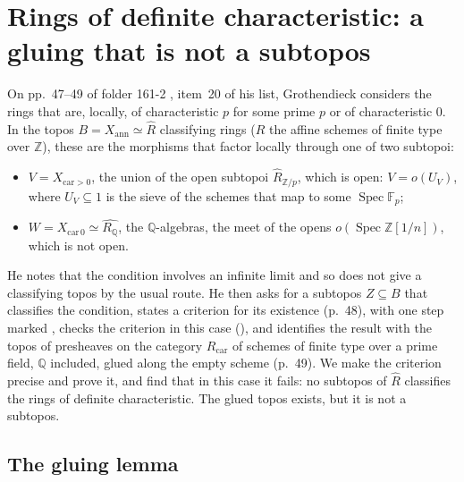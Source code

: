 \section{Rings of definite characteristic: a gluing that is not a subtopos}\label{sec:characteristic}

On pp.~47--49 of folder 161-2 \cite{grothendieck-161-2}, item~20 of his list, Grothendieck considers the rings that are, locally, of characteristic $p$ for some prime $p$ or of characteristic $0$. In the topos $B = X_{\mathrm{ann}} \simeq \widehat R$ classifying rings ($R$ the affine schemes of finite type over $\mathbb Z$), these are the morphisms that factor locally through one of two subtopoi:
\begin{itemize}
\item $V = X_{\mathrm{car}>0}$, the union of the open subtopoi $\widehat R_{\mathbb Z/p}$, which is open: $V = o(U_V)$, where $U_V \subseteq 1$ is the sieve of the schemes that map to some $\operatorname{Spec}\mathbb F_p$;
\item $W = X_{\mathrm{car}\,0} \simeq \widehat{R_{\mathbb Q}}$, the $\mathbb Q$-algebras, the meet of the opens $o(\operatorname{Spec}\mathbb Z[1/n])$, which is not open.
\end{itemize}
He notes that the condition involves an infinite limit and so does not give a classifying topos by the usual route. He then asks for a subtopos $Z \subseteq B$ that classifies the condition, states a criterion for its existence (p.~48), with one step marked , checks the criterion in this case (), and identifies the result with the topos of presheaves on the category $R_{\mathrm{car}}$ of schemes of finite type over a prime field, $\mathbb Q$ included, glued along the empty scheme (p.~49). We make the criterion precise and prove it, and find that in this case it fails: no subtopos of $\widehat R$ classifies the rings of definite characteristic. The glued topos exists, but it is not a subtopos.

\subsection{The gluing lemma}

